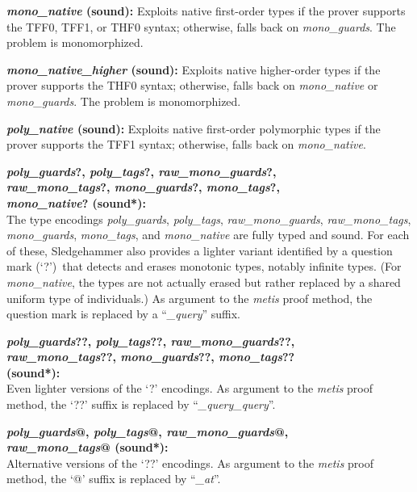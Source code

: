 \documentclass[a4paper,12pt]{article}
\begin{document}
\begin{enum}
\begin{enum}
\item[\labelitemi] \textbf{\textit{mono\_native} (sound):} Exploits native
first-order types if the prover supports the TFF0, TFF1, or THF0 syntax;
otherwise, falls back on \textit{mono\_guards}. The problem is monomorphized.

\item[\labelitemi] \textbf{\textit{mono\_native\_higher} (sound):} Exploits
native higher-order types if the prover supports the THF0 syntax; otherwise,
falls back on \textit{mono\_native} or \textit{mono\_guards}. The problem is
monomorphized.

\item[\labelitemi] \textbf{\textit{poly\_native} (sound):} Exploits native
first-order polymorphic types if the prover supports the TFF1 syntax; otherwise,
falls back on \textit{mono\_native}.

\item[\labelitemi]
\textbf{%
\textit{poly\_guards}?, \textit{poly\_tags}?, \textit{raw\_mono\_guards}?, \\
\textit{raw\_mono\_tags}?, \textit{mono\_guards}?, \textit{mono\_tags}?, \\
\textit{mono\_native}? (sound*):} \\
The type encodings \textit{poly\_guards}, \textit{poly\_tags},
\textit{raw\_mono\_guards}, \textit{raw\_mono\_tags}, \textit{mono\_guards},
\textit{mono\_tags}, and \textit{mono\_native} are fully typed and sound. For
each of these, Sledgehammer also provides a lighter variant identified by a
question mark (`\hbox{?}')\ that detects and erases monotonic types, notably
infinite types. (For \textit{mono\_native}, the types are not actually erased
but rather replaced by a shared uniform type of individuals.) As argument to the
\textit{metis} proof method, the question mark is replaced by a
\hbox{``\textit{\_query\/}''} suffix.

\item[\labelitemi]
\textbf{%
\textit{poly\_guards}??, \textit{poly\_tags}??, \textit{raw\_mono\_guards}??, \\
\textit{raw\_mono\_tags}??, \textit{mono\_guards}??, \textit{mono\_tags}?? \\
(sound*):} \\
Even lighter versions of the `\hbox{?}' encodings. As argument to the
\textit{metis} proof method, the `\hbox{??}' suffix is replaced by
\hbox{``\textit{\_query\_query\/}''}.

\item[\labelitemi]
\textbf{%
\textit{poly\_guards}@, \textit{poly\_tags}@, \textit{raw\_mono\_guards}@, \\
\textit{raw\_mono\_tags}@ (sound*):} \\
Alternative versions of the `\hbox{??}' encodings. As argument to the
\textit{metis} proof method, the `\hbox{@}' suffix is replaced by
\hbox{``\textit{\_at\/}''}.


\end{enum}
\end{enum}
\end{document}
